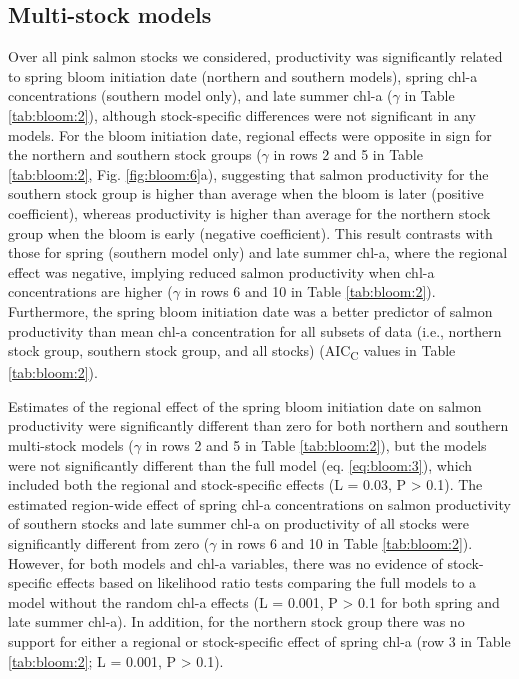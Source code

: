 \subsection{Multi-stock models}

Over all pink salmon stocks we considered, productivity was significantly
related to spring bloom initiation date (northern and southern models), spring
chl-a concentrations (southern model only), and late summer chl-a (\(\gamma\) in
Table \ref{tab:bloom:2}), although stock-specific differences were not significant in any
models. For the bloom initiation date, regional effects were opposite in sign
for the northern and southern stock groups (\(\gamma\) in rows 2 and 5 in Table
\ref{tab:bloom:2}, Fig. \ref{fig:bloom:6}a), suggesting that salmon productivity for the southern stock group is
higher than average when the bloom is later (positive coefficient), whereas
productivity is higher than average for the northern stock group when the bloom
is early (negative coefficient). This result contrasts with those for spring
(southern model only) and late summer chl-a, where the regional effect was
negative, implying reduced salmon productivity when chl-a concentrations are
higher (\(\gamma\) in rows 6 and 10 in Table \ref{tab:bloom:2}). Furthermore, the spring bloom
initiation date was a better predictor of salmon productivity than mean chl-a
concentration for all subsets of data (i.e., northern stock group, southern
stock group, and all stocks) (AIC\textsubscript{C} values in Table \ref{tab:bloom:2}).

Estimates of the regional effect of the spring bloom initiation date on salmon
productivity were significantly different than zero for both northern and
southern multi-stock models (\(\gamma\) in rows 2 and 5 in Table
\ref{tab:bloom:2}), but the
models were not significantly different than the full model (eq. \ref{eq:bloom:3}), which
included both the regional and stock-specific effects (L = 0.03, P
\textgreater{} 0.1). The estimated region-wide effect of spring chl-a
concentrations on salmon productivity of southern stocks and late summer chl-a
on productivity of all stocks were significantly different from zero (\(\gamma\)
in rows 6 and 10 in Table \ref{tab:bloom:2}). However, for both models and chl-a variables,
there was no evidence of stock-specific effects based on likelihood ratio tests
comparing the full models to a model without the random chl-a effects (L =
0.001, P \textgreater{} 0.1 for both spring and late summer chl-a). In addition,
for the northern stock group there was no support for either a regional or
stock-specific effect of spring chl-a (row 3 in Table \ref{tab:bloom:2}; L = 0.001, P
\textgreater{} 0.1).

